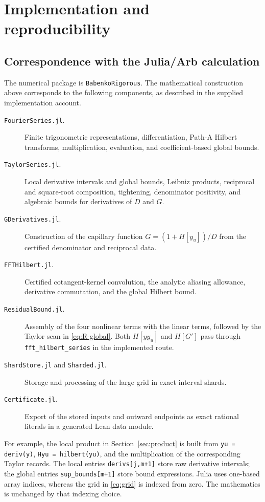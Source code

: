 \documentclass[11pt]{article}
\numberwithin{equation}{section}
\newcommand{\code}[1]{\texttt{#1}}
\begin{document}
\appendix
\section{Implementation and reproducibility}
\label{sec:implementation}

\subsection{Correspondence with the Julia/Arb calculation}

The numerical package is \code{BabenkoRigorous}. The mathematical
construction above corresponds to the following components, as described
in the supplied implementation account.
\begin{description}
 \item[\code{FourierSeries.jl}.]
 Finite trigonometric representations, differentiation, Path-A Hilbert
 transforms, multiplication, evaluation, and coefficient-based global bounds.
 \item[\code{TaylorSeries.jl}.]
 Local derivative intervals and global bounds, Leibniz products,
 reciprocal and square-root composition, tightening, denominator positivity,
 and algebraic bounds for derivatives of $D$ and $G$.
 \item[\code{GDerivatives.jl}.]
 Construction of the capillary function $G=(1+H[y_u])/D$ from the
 certified denominator and reciprocal data.
 \item[\code{FFTHilbert.jl}.]
 Certified cotangent-kernel convolution, the analytic aliasing allowance,
 derivative commutation, and the global Hilbert bound.
 \item[\code{ResidualBound.jl}.]
 Assembly of the four nonlinear terms with the linear terms, followed by
 the Taylor scan in \eqref{eq:R-global}. Both $H[yy_u]$ and $H[G']$ pass
 through \code{fft\_hilbert\_series} in the implemented route.
 \item[\code{ShardStore.jl} and \code{Sharded.jl}.]
 Storage and processing of the large grid in exact interval shards.
 \item[\code{Certificate.jl}.]
 Export of the stored inputs and outward endpoints as exact rational
 literals in a generated Lean data module.
\end{description}

For example, the local product in Section~\ref{sec:product} is built from
\code{yu = deriv(y)}, \code{Hyu = hilbert(yu)}, and the multiplication
of the corresponding Taylor records. The local entries
\code{derivs[j,m+1]} store raw derivative intervals; the global entries
\code{sup\_bounds[m+1]} store bound expressions. Julia uses one-based
array indices, whereas the grid in \eqref{eq:grid} is indexed from zero.
The mathematics is unchanged by that indexing choice.
\end{document}

